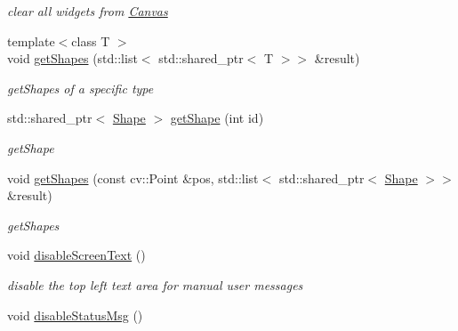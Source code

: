 \begin{DoxyCompactItemize}
\begin{DoxyCompactList}\small\item\em clear all widgets from \hyperlink{classcanvascv_1_1Canvas}{Canvas} \end{DoxyCompactList}\item 
{\footnotesize template$<$class T $>$ }\\void \hyperlink{classcanvascv_1_1Canvas_a6201675a6b8a13b3e004456225987dfa}{get\+Shapes} (std\+::list$<$ std\+::shared\+\_\+ptr$<$ T $>$$>$ \&result)
\begin{DoxyCompactList}\small\item\em get\+Shapes of a specific type \end{DoxyCompactList}\item 
std\+::shared\+\_\+ptr$<$ \hyperlink{classcanvascv_1_1Shape}{Shape} $>$ \hyperlink{classcanvascv_1_1Canvas_a7b799712dccb4316648a3c1a09a8279f}{get\+Shape} (int id)
\begin{DoxyCompactList}\small\item\em get\+Shape \end{DoxyCompactList}\item 
void \hyperlink{classcanvascv_1_1Canvas_aec742570f7a4fd9dc2671826ca3a159a}{get\+Shapes} (const cv\+::\+Point \&pos, std\+::list$<$ std\+::shared\+\_\+ptr$<$ \hyperlink{classcanvascv_1_1Shape}{Shape} $>$$>$ \&result)
\begin{DoxyCompactList}\small\item\em get\+Shapes \end{DoxyCompactList}\item 
void \hyperlink{classcanvascv_1_1Canvas_afbc5ba3255edc06c63ce2a64e732754b}{disable\+Screen\+Text} ()\hypertarget{classcanvascv_1_1Canvas_afbc5ba3255edc06c63ce2a64e732754b}{}\label{classcanvascv_1_1Canvas_afbc5ba3255edc06c63ce2a64e732754b}

\begin{DoxyCompactList}\small\item\em disable the top left text area for manual user messages \end{DoxyCompactList}\item 
void \hyperlink{classcanvascv_1_1Canvas_ad307658a70d97c360af99d3738fee972}{disable\+Status\+Msg} ()\hypertarget{classcanvascv_1_1Canvas_ad307658a70d97c360af99d3738fee972}{}\label{classcanvascv_1_1Canvas_ad307658a70d97c360af99d3738fee972}


\end{DoxyCompactItemize}
